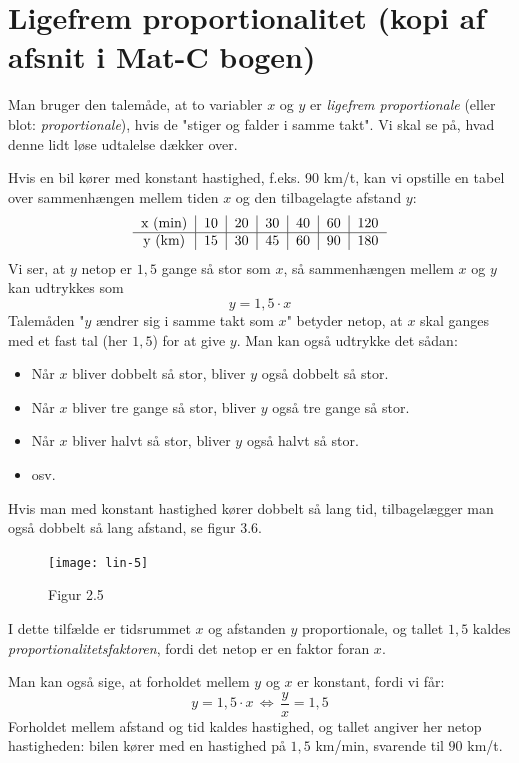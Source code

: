 \documentclass[12pt,oneside,a4paper]{article}
\begin{document}

\section{Ligefrem proportionalitet (kopi af afsnit i Mat-C bogen)}
Man bruger den talemåde, at to variabler $x$ og $y$ er {\em ligefrem
proportionale} (eller blot: {\em proportionale}), hvis de "stiger og falder i
samme takt". Vi skal se på, hvad denne lidt løse udtalelse dækker over.

Hvis en bil kører med konstant hastighed, f.eks. 90 km/t, kan vi opstille en
tabel over sammenhængen mellem tiden $x$ og den tilbagelagte afstand $y$:
\[
\begin{tabular}{c|c|c|c|c|c|c}
    x ({\rm min}) & 10 & 20 & 30 & 40 & 60 & 120 \\
    \hline
    y ({\rm km})  & 15 & 30 & 45 & 60 & 90 & 180  
\end{tabular}
\]
Vi ser, at $y$ netop er $1,5$ gange så stor som $x$, så sammenhængen mellem $x$
og $y$ kan udtrykkes som
\[
y = 1,5\cdot x
\]
Talemåden "$y$ ændrer sig i samme takt som $x$" betyder netop, at $x$ skal
ganges med et fast tal (her $1,5$) for at give $y$. Man kan også udtrykke det
sådan:
\begin{itemize}
    \item Når $x$ bliver dobbelt så stor, bliver $y$ også dobbelt så stor.
    \item Når $x$ bliver tre gange så stor, bliver $y$ også tre gange så stor.
    \item Når $x$ bliver halvt så stor, bliver $y$ også halvt så stor.
    \item osv.
\end{itemize}
Hvis man med konstant hastighed kører dobbelt så lang tid, tilbagelægger man
også dobbelt så lang afstand, se figur 3.6.

\begin{figure}[H]
    \centering
    \texttt{[image: lin-5]}
    \caption{Figur 2.5}
    \label{fig36}
\end{figure}

I dette tilfælde er tidsrummet $x$ og afstanden $y$ proportionale, og tallet
$1,5$ kaldes {\em proportionalitetsfaktoren}, fordi det netop er en faktor foran $x$.

Man kan også sige, at forholdet mellem $y$ og $x$ er konstant, fordi vi får:
\[
y = 1,5\cdot x \, \Leftrightarrow \, \frac{y}{x} = 1,5
\]
Forholdet mellem afstand og tid kaldes hastighed, og tallet angiver her netop
hastigheden: bilen kører med en hastighed på $1,5$ km/min, svarende til $90$
km/t.
\end{document}

